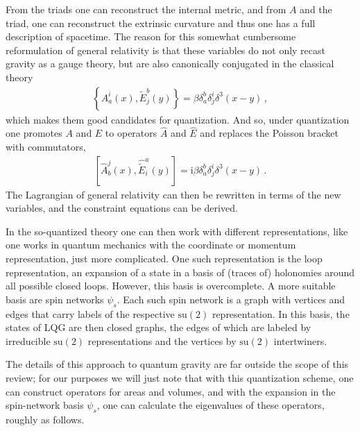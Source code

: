 \documentclass{article}
\def\beqn{\begin{eqnarray}}
\def\eeqn{\end{eqnarray}}
\begin{document}
From the triads one can reconstruct the internal metric, and from $A$ and the
triad, one can reconstruct the extrinsic curvature and thus one has a full description of spacetime. 
The reason for this somewhat cumbersome reformulation of general relativity is that these variables do not
only recast gravity as a gauge theory, but are also canonically conjugated 
in the classical theory
\beqn
\left\{ A^i_a(x), \tilde E^b_j(y) \right\} = \beta \delta_a^b \delta_j^i \delta^3(x-y) \,,
\eeqn 
which makes them good candidates for quantization. And so, under quantization one promotes $A$ and $E$ 
to operators $\hat A$ and $\hat E$ and replaces the 
Poisson bracket with commutators,
\beqn
\left[\hat A^j_b(x), \hat{\tilde E}^a_i(y) \right] = \mathrm{i} \beta \delta_a^b \delta_j^i \delta^3(x-y) \,.
\eeqn
The Lagrangian of general relativity can then be rewritten in terms of the new variables, 
and the constraint equations can be derived.  

In the so-quantized theory one can then work with different representations, like one works in quantum mechanics with
the coordinate or momentum representation, just more complicated. One such representation is the loop representation, an expansion
of a state in a basis of (traces of) holonomies around all possible closed loops. However, this basis
is overcomplete. A more suitable basis are spin networks $\psi_s$. Each such spin network is a graph with vertices and edges that carry 
labels of the respective $\mathrm{su}(2)$ representation. In this basis, the states of {\sc LQG} are then 
closed graphs, the edges of which 
are labeled by irreducible $\mathrm{su}(2)$ representations and the vertices by $\mathrm{su}(2)$ 
intertwiners. 

The details of this approach to quantum gravity are far outside the scope of this review; 
for our purposes we will just note that with this
quantization scheme, one can construct operators for areas and volumes, and with the expansion in the
spin-network basis $\psi_s$, one can calculate the eigenvalues of these operators, roughly as follows.
\end{document}
